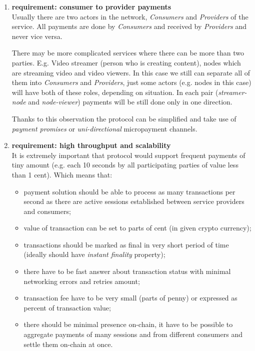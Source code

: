 \documentclass[a4paper,12pt]{article}
\begin{document}
\begin{enumerate}
    \item \textbf{requirement: consumer to provider payments}\\
    Usually there are two actors in the network, \textit{Consumers} and 
    \textit{Providers} of the service. All payments are done by 
    \textit{Consumers} and received by \textit{Providers} and never vice versa.

    There may be more complicated services where there can be more than two 
    parties. E.g. Video streamer (person who is creating content), nodes which 
    are streaming video and video viewers. In this case we still can separate 
    all of them into \textit{Consumers} and \textit{Providers}, just some 
    actors (e.g. nodes in this case) will have both of these roles, depending 
    on situation. In each pair (\textit{streamer-node} and \textit{node-viewer}) 
    payments will be still done only in one direction.

    Thanks to this observation the protocol can be simplified and take use of 
    \textit{payment promises} or \textit{uni-directional} micropayment channels.

    \item \textbf{requirement: high throughput and scalability}\\
    It is extremely important that protocol would support frequent payments of
    tiny amount (e.g. each 10 seconds by all participating parties of value less
    than 1 cent). Which means that:
    \begin{itemize}
        \item payment solution should be able to process as many transactions 
        per second as there are active sessions established between service 
        providers and consumers;
        \item value of transaction can be set to parts of cent (in given crypto
        currency);
        \item transactions should be marked as final in very short period of 
        time (ideally should have \textit{instant finality} property);
        \item there have to be fast answer about transaction status with minimal
        networking errors and retries amount;
        \item transaction fee have to be very small (parts of penny) or 
        expressed as percent of transaction value;
        \item there should be minimal presence on-chain, it have to be possible
        to aggregate payments of many sessions and from different consumers and 
        settle them on-chain at once.
    \end{itemize}


\end{enumerate}
\end{document}
